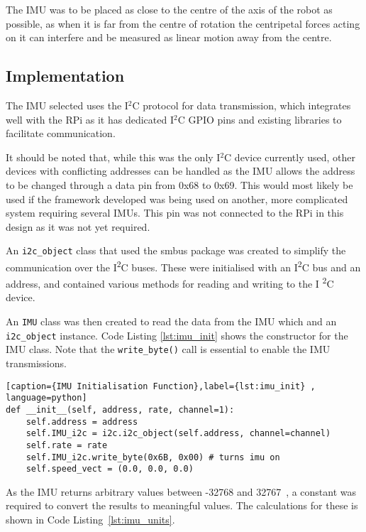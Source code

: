 The IMU was to be placed as close to the centre of the axis of the robot
as possible, as when it is far from the centre of rotation the centripetal
forces acting on it can interfere and be measured as linear motion away
from the centre.

\subsection{Implementation}\label{elec/imu/impl}
The IMU selected uses the I$^2$C protocol for data transmission, which
integrates well with the RPi as it has dedicated I$^2$C GPIO pins and
existing libraries to facilitate communication.

It should be noted that, while this was the only I$^2$C device currently
used, other devices with conflicting addresses can be handled as the IMU
allows the address to be changed through a data pin from 0x68 to 0x69.
This would most likely be used if the framework developed was being used
on another, more complicated system requiring several IMUs. This pin was
not connected to the RPi in this design as it was not yet required.

An \verb|i2c_object| class that used the smbus package was created to
simplify the communication over the I\textsuperscript{2}C buses. These
were initialised with an I\textsuperscript{2}C bus and an address, and
contained various methods for reading and writing to the I
\textsuperscript{2}C device.


An \verb|IMU| class was then created to read the data from the IMU which
and an \verb|i2c_object| instance. Code Listing \ref{lst:imu_init} shows
the constructor for the IMU class. Note that the \verb|write_byte()| call
is essential to enable the IMU transmissions.

\begin{lstlisting}[caption={IMU Initialisation Function},label={lst:imu_init} , language=python]
def __init__(self, address, rate, channel=1):
    self.address = address
    self.IMU_i2c = i2c.i2c_object(self.address, channel=channel)
    self.rate = rate
    self.IMU_i2c.write_byte(0x6B, 0x00) # turns imu on
    self.speed_vect = (0.0, 0.0, 0.0)
\end{lstlisting}

As the IMU returns arbitrary values between -32768 and 32767~\cite{MPU6050Datasheet}, a constant was required to convert the results to
meaningful values. The calculations for these is shown in Code
Listing~\ref{lst:imu_units}.


